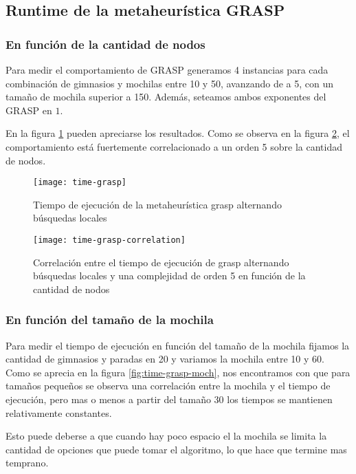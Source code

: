 \subsection{Runtime de la metaheurística GRASP}
\label{sec:time-grasp}

\subsubsection{En función de la cantidad de nodos}

Para medir el comportamiento de GRASP generamos 4 instancias para cada combinación de gimnasios y mochilas entre 10 y 50, avanzando de a 5, con un tamaño de mochila superior a 150. Además, seteamos ambos exponentes del GRASP en $1$.

En la figura \ref{fig:time-grasp} pueden apreciarse los resultados. Como se observa en la figura \ref{fig:time-grasp-correlation}, el comportamiento está fuertemente correlacionado a un orden 5 sobre la cantidad de nodos.

\begin{figure}[H]
    \centering
    \texttt{[image: time-grasp]}
    \caption{Tiempo de ejecución de la metaheurística grasp alternando búsquedas locales}
    \label{fig:time-grasp}
\end{figure}

\begin{figure}[H]
    \centering
    \texttt{[image: time-grasp-correlation]}
    \caption{Correlación entre el tiempo de ejecución de grasp alternando búsquedas locales y una complejidad de orden 5 en función de la cantidad de nodos}
    \label{fig:time-grasp-correlation}
\end{figure}

\subsubsection{En función del tamaño de la mochila}

Para medir el tiempo de ejecución en función del tamaño de la mochila fijamos la cantidad de gimnasios y paradas en 20 y variamos la mochila entre 10 y 60. Como se aprecia en la figura \ref{fig:time-grasp-moch}, nos encontramos con que para tamaños pequeños se observa una correlación entre la mochila y el tiempo de ejecución, pero mas o menos a partir del tamaño 30 los tiempos se mantienen relativamente constantes.

Esto puede deberse a que cuando hay poco espacio el la mochila se limita la cantidad de opciones que puede tomar el algoritmo, lo que hace que termine mas temprano.

